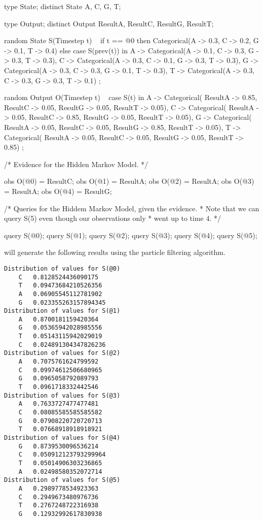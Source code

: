 \begin{blogcode}
type State;
distinct State A, C, G, T;

type Output;
distinct Output ResultA, ResultC, ResultG, ResultT;

random State S(Timestep t) ~
  if t == @0 then 
    Categorical({A -> 0.3, C -> 0.2, G -> 0.1, T -> 0.4})
  else case S(prev(t)) in {
    A -> Categorical({A -> 0.1, C -> 0.3, G -> 0.3, T -> 0.3}),
    C -> Categorical({A -> 0.3, C -> 0.1, G -> 0.3, T -> 0.3}),
    G -> Categorical({A -> 0.3, C -> 0.3, G -> 0.1, T -> 0.3}),
    T -> Categorical({A -> 0.3, C -> 0.3, G -> 0.3, T -> 0.1})
  };

random Output O(Timestep t) ~ 
  case S(t) in {
    A -> Categorical({
      ResultA -> 0.85, ResultC -> 0.05, 
      ResultG -> 0.05, ResultT -> 0.05}),
    C -> Categorical({
      ResultA -> 0.05, ResultC -> 0.85, 
      ResultG -> 0.05, ResultT -> 0.05}),
    G -> Categorical({
      ResultA -> 0.05, ResultC -> 0.05, 
      ResultG -> 0.85, ResultT -> 0.05}),
    T -> Categorical({
      ResultA -> 0.05, ResultC -> 0.05, 
      ResultG -> 0.05, ResultT -> 0.85})
  };

/* Evidence for the Hidden Markov Model.
 */

obs O(@0) = ResultC;
obs O(@1) = ResultA;
obs O(@2) = ResultA;
obs O(@3) = ResultA;
obs O(@4) = ResultG;

/* Queries for the Hiddem Markov Model, given the evidence.  
 * Note that we can query S(5) even though our observations only 
 * went up to time 4.
 */

query S(@0);
query S(@1);
query S(@2);
query S(@3);
query S(@4);
query S(@5);
\end{blogcode}

\bl will generate the following results using the particle filtering algorithm. 
\begin{verbatim}
Distribution of values for S(@0)
	C	0.8128524436090175
	T	0.09473684210526356
	A	0.06905545112781902
	G	0.023355263157894345
Distribution of values for S(@1)
	A	0.8700181159420364
	G	0.05365942028985556
	T	0.05143115942029019
	C	0.024891304347826236
Distribution of values for S(@2)
	A	0.7075761624799592
	C	0.09974612506680965
	G	0.0965058792089793
	T	0.0961718332442546
Distribution of values for S(@3)
	A	0.7633727477477481
	C	0.08085585585585582
	G	0.07908220720720713
	T	0.07668918918918921
Distribution of values for S(@4)
	G	0.8739530096536214
	C	0.050912123793299964
	T	0.05014906303236865
	A	0.02498580352072714
Distribution of values for S(@5)
	A	0.2989778534923363
	C	0.2949673480976736
	T	0.2767248722316938
	G	0.12932992617830938
\end{verbatim}

